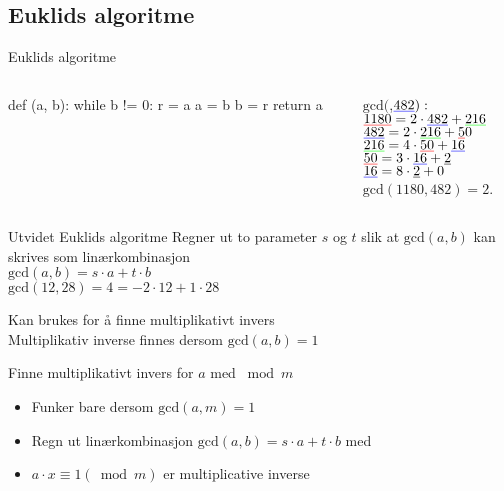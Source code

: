 \subsection{Euklids algoritme}
\begin{frame}[fragile]{Euklids algoritme}
\begin{columns}
    \begin{column}{0.45\textwidth}
\begin{python}
def (a, b):
    while b != 0:
        r = a %
        a = b
        b = r
    return a
\end{python}
 	\end{column}
 	\pause
    \begin{column}{0.45\textwidth}
        $\text{gcd}($,$\mathunderline{blue}{482}):$\\[2mm]
        \pause
        $\mathunderline{red}{1180} = 2 \cdot \mathunderline{blue}{482} + \mathunderline{green}{216}$\\
        \pause
        $\mathunderline{blue}{482} = 2 \cdot \mathunderline{green}{216} + \mathunderline{red}50$\\
        \pause
        $\mathunderline{green}{216} = 4 \cdot \mathunderline{red}{50} + \mathunderline{blue}{16}$\\
        \pause
        $\mathunderline{red}{50} = 3 \cdot \mathunderline{blue}{16} + \underline{2}$\\
        \pause
        $\mathunderline{blue}{16} = 8 \cdot \underline{2} + 0$\\[2mm]

        \pause
        $\text{gcd}(1180,482) = 2$.
 	\end{column}
\end{columns}


\end{frame}

\begin{frame}[fragile]{}
\begin{block}{Utvidet Euklids algoritme}
Regner ut to parameter $s$ og $t$ slik at $\text{gcd}(a,b)$ kan skrives som linærkombinasjon\\
$\text{gcd}(a,b)=s\cdot a+t\cdot b$\\
$\text{gcd}(12,28)=4=-2\cdot 12 + 1\cdot 28$\medskip

Kan brukes for å finne multiplikativt invers\\
Multiplikativ inverse finnes dersom $\text{gcd}(a,b)=1$
\end{block}
\pause

\begin{block}{Finne multiplikativt invers for $a$ med $\bmod m$}
\begin{itemize}
\item Funker bare dersom $\text{gcd}(a,m)=1$\\
\item Regn ut linærkombinasjon $\text{gcd}(a,b)=s\cdot a+t\cdot b$ med 
\item $a\cdot x \equiv 1 (\bmod m)$ er multiplicative inverse
\end{itemize}
\end{block}
\end{frame}


